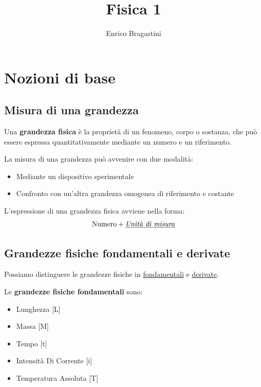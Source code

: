 \documentclass[a4paper,11pt,oneside]{book}
\title{\Large{\textbf{Fisica 1}}}
\author{Enrico Bragastini}
\begin{document}
\pagestyle{fancy}
\fancyhf{}
\rhead{}
\lhead{\nouppercase\leftmark}
\cfoot{\thepage}
\frontmatter

\maketitle
\tableofcontents

\mainmatter
\chapter{Nozioni di base}
\section{Misura di una grandezza}
Una \textbf{grandezza fisica} è la proprietà di un fenomeno, corpo o sostanza, che può essere espressa
quantitativamente mediante un numero e un riferimento.

\noindent La misura di una grandezza può avvenire con due modalità:
\begin{itemize}
    \item Mediante un dispositivo sperimentale
    \item Confronto con un'altra grandezza omogenea di riferimento e costante
\end{itemize}

\noindent L'espressione di una grandezza fisica avviene nella forma:
\begin{equation*}
    \text{Numero} + \text{\underline{\emph{Unità di misura}}}
\end{equation*}

\section{Grandezze fisiche fondamentali e derivate}
Possiamo distinguere le grandezze fisiche in \underline{fondamentali} e \underline{derivate}.

\noindent Le \textbf{grandezze fisiche fondamentali} sono:
\begin{itemize}
    \item Lunghezza                 \tabto{7cm} [L]
    \item Massa                     \tabto{7cm}  [M]
    \item Tempo                     \tabto{7cm}  [t]
    \item Intensità Di Corrente     \tabto{7cm}  [i]
    \item Temperatura Assoluta      \tabto{7cm}  [T]
\end{itemize}
\end{document}
